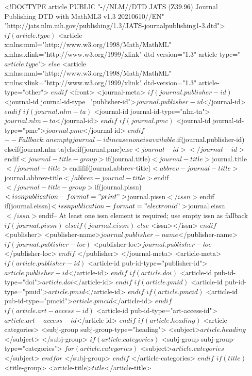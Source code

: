 <!DOCTYPE article PUBLIC "-//NLM//DTD JATS (Z39.96) Journal Publishing DTD with MathML3 v1.3 20210610//EN" "http://jats.nlm.nih.gov/publishing/1.3/JATS-journalpublishing1-3.dtd"> 
$if(article.type)$
<article xmlns:mml="http://www.w3.org/1998/Math/MathML" xmlns:xlink="http://www.w3.org/1999/xlink" dtd-version="1.3" article-type="$article.type$">
$else$
<article xmlns:mml="http://www.w3.org/1998/Math/MathML" xmlns:xlink="http://www.w3.org/1999/xlink" dtd-version="1.3" article-type="other">
$endif$
<front>
<journal-meta>
$if(journal.publisher-id)$
<journal-id journal-id-type="publisher-id">$journal.publisher-id$</journal-id>
$endif$
$if(journal.nlm-ta)$
<journal-id journal-id-type="nlm-ta">$journal.nlm-ta$</journal-id>
$endif$
$if(journal.pmc)$
<journal-id journal-id-type="pmc">$journal.pmc$</journal-id>
$endif$
$-- Fallback: an empty journal-id in case none is available.
$if(journal.publisher-id)$
$elseif(journal.nlm-ta)$
$elseif(journal.pmc)$
$else$
<journal-id></journal-id>
$endif$
<journal-title-group>
$if(journal.title)$
<journal-title>$journal.title$</journal-title>
$endif$
$if(journal.abbrev-title)$
<abbrev-journal-title>$journal.abbrev-title$</abbrev-journal-title>
$endif$
</journal-title-group>
$if(journal.pissn)$
<issn publication-format="print">$journal.pissn$</issn>
$endif$
$if(journal.eissn)$
<issn publication-format="electronic">$journal.eissn$</issn>
$endif$
$-- At least one issn element is required; use empty issn as fallback
$if(journal.pissn)$
$elseif(journal.eissn)$
$else$
<issn></issn>
$endif$
<publisher>
<publisher-name>$journal.publisher-name$</publisher-name>
$if(journal.publisher-loc)$
<publisher-loc>$journal.publisher-loc$</publisher-loc>
$endif$
</publisher>
</journal-meta>
<article-meta>
$if(article.publisher-id)$
<article-id pub-id-type="publisher-id">$article.publisher-id$</article-id>
$endif$
$if(article.doi)$
<article-id pub-id-type="doi">$article.doi$</article-id>
$endif$
$if(article.pmid)$
<article-id pub-id-type="pmid">$article.pmid$</article-id>
$endif$
$if(article.pmcid)$
<article-id pub-id-type="pmcid">$article.pmcid$</article-id>
$endif$
$if(article.art-access-id)$
<article-id pub-id-type="art-access-id">$article.art-access-id$</article-id>
$endif$
$if(article.heading)$
<article-categories>
<subj-group subj-group-type="heading">
<subject>$article.heading$</subject>
</subj-group>
$if(article.categories)$
<subj-group subj-group-type="categories">
$for(article.categories)$
<subject>$article.categories$</subject>
$endfor$
</subj-group>
$endif$
</article-categories>
$endif$
$if(title)$
<title-group>
<article-title>$title$</article-title>

